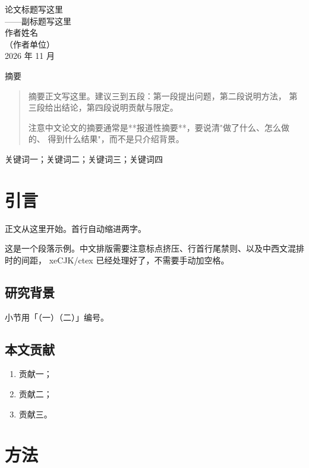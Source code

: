 \documentclass[UTF8,a4paper,11pt]{ctexart}
\newenvironment{cnabstract}{%
  \begin{center}\small\heiti 摘\quad 要\end{center}
  \begin{quote}\small\setstretch{1.25}%
}{%
  \end{quote}
}
\newcommand{\keywords}[1]{%
  \par\vspace{0.6em}\noindent{\small\heiti 关键词：}#1\par\vspace{1.2em}%
}
\begin{document}
\begin{center}
  {\LARGE\heiti 论文标题写这里}\\[0.5em]
  {\large\heiti ——副标题写这里}\\[1.2em]
  {\normalsize 作者姓名}\\[0.4em]
  {\small （作者单位）}\\[0.3em]
  {\small 2026 年 11 月}
\end{center}

\vspace{1em}

\begin{cnabstract}
摘要正文写这里。建议三到五段：第一段提出问题，第二段说明方法，
第三段给出结论，第四段说明贡献与限定。

注意中文论文的摘要通常是**报道性摘要**，要说清"做了什么、怎么做的、
得到什么结果"，而不是只介绍背景。
\end{cnabstract}

\keywords{关键词一；关键词二；关键词三；关键词四}

\section{引言}

正文从这里开始。首行自动缩进两字。

这是一个段落示例。中文排版需要注意标点挤压、行首行尾禁则、以及中西文混排时的间距，
xeCJK/ctex 已经处理好了，不需要手动加空格。

\subsection{研究背景}

小节用「（一）（二）」编号。

\subsection{本文贡献}

\begin{enumerate}[leftmargin=2em,itemsep=0.3em]
  \item 贡献一；
  \item 贡献二；
  \item 贡献三。
\end{enumerate}

\section{方法}
\end{document}
